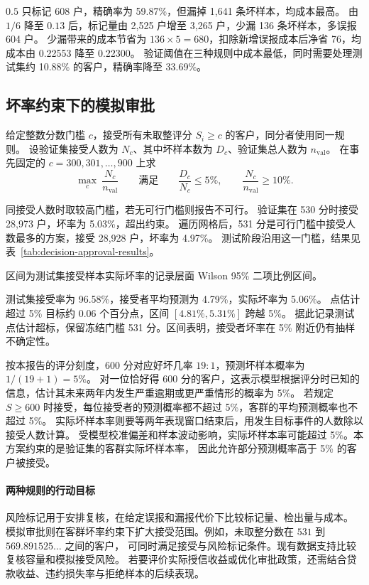 $0.5$ 只标记 608 户，精确率为 59.87\%，但漏掉 1,641 条坏样本，均成本最高。
由 $1/6$ 降至 $0.13$ 后，标记量由 2,525 户增至 3,265 户，少漏 136 条坏样本，多误报 604 户。
少漏带来的成本节省为 $136\times5=680$，扣除新增误报成本后净省 76，均成本由 0.22553 降至 0.22300。
验证阈值在三种规则中成本最低，同时需要处理测试集约 10.88\% 的客户，精确率降至 33.69\%。

\subsection{坏率约束下的模拟审批}
给定整数分数门槛 $c$，接受所有未取整评分 $S_i\geq c$ 的客户，同分者使用同一规则。
设验证集接受人数为 $N_c$、其中坏样本数为 $D_c$、验证集总人数为 $n_{\mathrm{val}}$。
在事先固定的 $c=300,301,\ldots,900$ 上求
\[
  \max_c\ \frac{N_c}{n_{\mathrm{val}}}
  \qquad\text{满足}\qquad
  \frac{D_c}{N_c}\leq 5\%,\qquad
  \frac{N_c}{n_{\mathrm{val}}}\geq 10\%.
\]

同接受人数时取较高门槛，若无可行门槛则报告不可行。
验证集在 530 分时接受 28,973 户，坏率为 5.03\%，超出约束。
遍历网格后，531 分是可行门槛中接受人数最多的方案，接受 28,928 户，坏率为 4.97\%。
测试阶段沿用这一门槛，结果见表~\ref{tab:decision-approval-results}。

\begin{table}[H]
  \centering
  \caption{冻结审批门槛在验证集与测试集上的表现}
  \label{tab:decision-approval-results}
  \small
  \setlength{\tabcolsep}{5pt}
  

  \smallskip
  \parbox{0.96\linewidth}{\small 区间为测试集接受样本实际坏率的记录层面 Wilson 95\% 二项比例区间。}
\end{table}

测试集接受率为 96.58\%，接受者平均预测为 4.79\%，实际坏率为 5.06\%。
点估计超过 5\% 目标约 0.06 个百分点，区间 $[4.81\%,5.31\%]$ 跨越 5\%。
据此记录测试点估计超标，保留冻结门槛 531 分。区间表明，接受者坏率在 5\% 附近仍有抽样不确定性。

按本报告的评分刻度，600 分对应好坏几率 $19:1$，预测坏样本概率为 $1/(19+1)=5\%$。
对一位恰好得 600 分的客户，这表示模型根据评分时已知的信息，估计其未来两年内发生严重逾期或更严重情形的概率为 5\%。
若规定 $S\geq 600$ 时接受，每位接受者的预测概率都不超过 5\%，客群的平均预测概率也不超过 5\%。
实际坏样本率则要等两年表现窗口结束后，用发生目标事件的人数除以接受人数计算。
受模型校准偏差和样本波动影响，实际坏样本率可能超过 5\%。本方案约束的是验证集的客群实际坏样本率，
因此允许部分预测概率高于 5\% 的客户被接受。

\paragraph{两种规则的行动目标}
风险标记用于安排复核，在给定误报和漏报代价下比较标记量、检出量与成本。
模拟审批则在客群坏率约束下扩大接受范围。例如，未取整分数在 $531$ 到 $569.891525\ldots$ 之间的客户，
可同时满足接受与风险标记条件。现有数据支持比较复核容量和模拟接受风险。
若要评价实际授信收益或优化审批政策，还需结合贷款收益、违约损失率与拒绝样本的后续表现。
